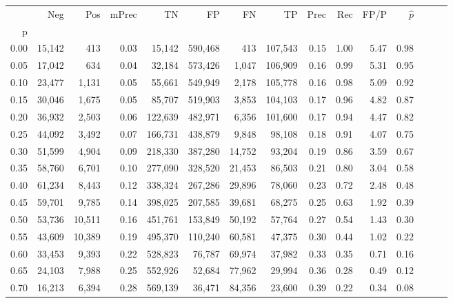 \begin{tabular}{rrrrrrrrrrrrrrr}
\toprule
{} &     Neg &     Pos & mPrec &       TN &       FP &       FN &       TP &  Prec &   Rec &  FP/P & $\hat{p}$ \\
p    &         &         &       &          &          &          &          &       &       &       &           \\
\midrule
0.00 &  15,142 &     413 &  0.03 &   15,142 &  590,468 &      413 &  107,543 &  0.15 &  1.00 &  5.47 &      0.98 \\
0.05 &  17,042 &     634 &  0.04 &   32,184 &  573,426 &    1,047 &  106,909 &  0.16 &  0.99 &  5.31 &      0.95 \\
0.10 &  23,477 &   1,131 &  0.05 &   55,661 &  549,949 &    2,178 &  105,778 &  0.16 &  0.98 &  5.09 &      0.92 \\
0.15 &  30,046 &   1,675 &  0.05 &   85,707 &  519,903 &    3,853 &  104,103 &  0.17 &  0.96 &  4.82 &      0.87 \\
0.20 &  36,932 &   2,503 &  0.06 &  122,639 &  482,971 &    6,356 &  101,600 &  0.17 &  0.94 &  4.47 &      0.82 \\
0.25 &  44,092 &   3,492 &  0.07 &  166,731 &  438,879 &    9,848 &   98,108 &  0.18 &  0.91 &  4.07 &      0.75 \\
0.30 &  51,599 &   4,904 &  0.09 &  218,330 &  387,280 &   14,752 &   93,204 &  0.19 &  0.86 &  3.59 &      0.67 \\
0.35 &  58,760 &   6,701 &  0.10 &  277,090 &  328,520 &   21,453 &   86,503 &  0.21 &  0.80 &  3.04 &      0.58 \\
0.40 &  61,234 &   8,443 &  0.12 &  338,324 &  267,286 &   29,896 &   78,060 &  0.23 &  0.72 &  2.48 &      0.48 \\
0.45 &  59,701 &   9,785 &  0.14 &  398,025 &  207,585 &   39,681 &   68,275 &  0.25 &  0.63 &  1.92 &      0.39 \\
0.50 &  53,736 &  10,511 &  0.16 &  451,761 &  153,849 &   50,192 &   57,764 &  0.27 &  0.54 &  1.43 &      0.30 \\
0.55 &  43,609 &  10,389 &  0.19 &  495,370 &  110,240 &   60,581 &   47,375 &  0.30 &  0.44 &  1.02 &      0.22 \\
0.60 &  33,453 &   9,393 &  0.22 &  528,823 &   76,787 &   69,974 &   37,982 &  0.33 &  0.35 &  0.71 &      0.16 \\
0.65 &  24,103 &   7,988 &  0.25 &  552,926 &   52,684 &   77,962 &   29,994 &  0.36 &  0.28 &  0.49 &      0.12 \\
0.70 &  16,213 &   6,394 &  0.28 &  569,139 &   36,471 &   84,356 &   23,600 &  0.39 &  0.22 &  0.34 &      0.08 \\

\end{tabular}
